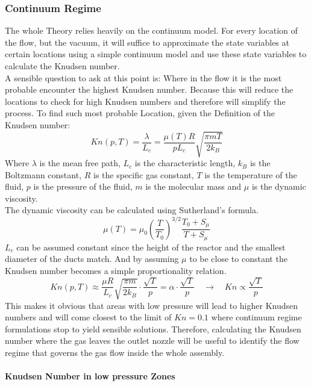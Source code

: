 
\subsubsection{Continuum Regime}
	The whole Theory relies heavily on the continuum model.
	For every location of the flow, but the vacuum, it will suffice to approximate the state variables at certain locations using a simple continuum model and use these state variables to calculate the Knudsen number.\\
	A sensible question to ask at this point is: Where in the flow it is the most probable encounter the highest Knudsen number.
	Because this will reduce the locations to check for high Knudsen numbers and therefore will simplify the process.
	To find such most probable Location, given the Definition of the Knudsen number:
	$$
		Kn(p,T) = \frac{\lambda}{L_c} = \frac{\mu(T)R}{pL_c}\sqrt{\frac{\pi m T}{2k_B}}
	$$
	Where $\lambda$ is the mean free path, $L_c$ is the characteristic length, $k_B$ is the Boltzmann constant, $R$ is the specific gas constant, $T$ is the temperature of the fluid, $p$ is the pressure of the fluid, $m$ is the molecular mass and $\mu$ is the dynamic viscosity.\\
	The dynamic viscosity can be calculated using Sutherland's formula.
	$$
		\mu(T) = \mu_0 \left(\frac{T}{T_0}\right)^{3/2} \frac{T_0 + S_\mu}{T + S_\mu}
	$$
	$L_c$ can be assumed constant since the height of the reactor and the smallest diameter of the ducts match.
	And by assuming $\mu$ to be close to constant the Knudsen number becomes a simple proportionality relation.
	$$
		Kn(p,T)\approx\frac{\mu R}{L_c}\sqrt{\frac{\pi m}{2k_B}}\cdot\frac{\sqrt{T}}{p}=\alpha\cdot\frac{\sqrt{T}}{p}\quad\rightarrow\quad Kn\propto \frac{\sqrt{T}}{p}
	$$
	This makes it obvious that areas with low pressure will lead to higher Knudsen numbers and will come closest to the limit of $Kn=0.1$ where continuum regime formulations stop to yield sensible solutions.
	Therefore, calculating the Knudsen number where the gas leaves the outlet nozzle will be useful to identify the flow regime that governs the gas flow inside the whole assembly.

	

\paragraph{Knudsen Number in low pressure Zones}

